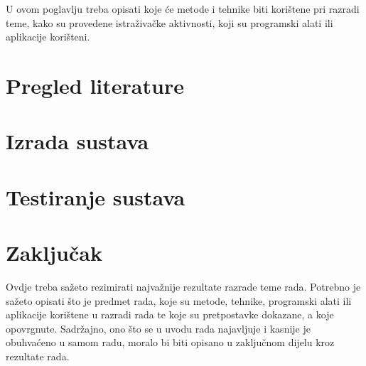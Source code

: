 \documentclass{foi}
\begin{document}
U ovom poglavlju treba opisati koje će metode i tehnike biti korištene pri razradi teme, kako su provedene istraživačke aktivnosti, koji su programski alati ili aplikacije korišteni.

\chapter{Pregled literature}

\chapter{Izrada sustava}

\chapter{Testiranje sustava}

\chapter{Zaključak}

Ovdje treba sažeto rezimirati najvažnije rezultate razrade teme rada. Potrebno je sažeto opisati što je predmet rada, koje su metode, tehnike, programski alati ili aplikacije korištene u razradi rada te koje su pretpostavke dokazane, a koje opovrgnute. Sadržajno, ono što se u uvodu rada najavljuje i kasnije je obuhvaćeno u samom radu, moralo bi biti opisano u zaključnom dijelu kroz rezultate rada.

\printbibliography[title=Popis literature]

\listoffigures
{}
 
\listoftables
{}
\end{document}
